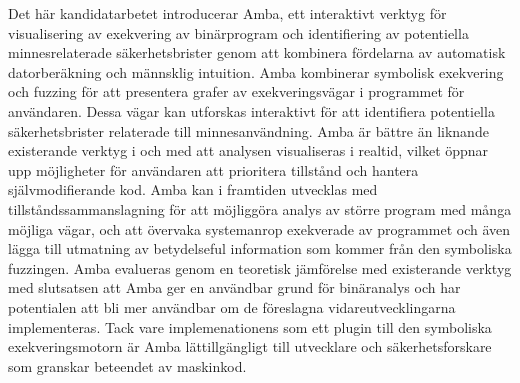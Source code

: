 Det här kandidatarbetet introducerar Amba, ett interaktivt verktyg för
visualisering av exekvering av binärprogram och identifiering av
potentiella minnesrelaterade säkerhetsbrister genom att kombinera
fördelarna av automatisk datorberäkning och männsklig intuition.  Amba
kombinerar symbolisk exekvering och fuzzing för att presentera grafer
av exekveringsvägar i programmet för användaren. Dessa vägar kan
utforskas interaktivt för att identifiera potentiella säkerhetsbrister
relaterade till minnesanvändning. Amba är bättre än liknande
existerande verktyg i och med att analysen visualiseras i realtid,
vilket öppnar upp möjligheter för användaren att prioritera tillstånd
och hantera självmodifierande kod. Amba kan i framtiden utvecklas med
tillståndssammanslagning för att möjliggöra analys av större program
med många möjliga vägar, och att övervaka systemanrop exekverade av
programmet och även lägga till utmatning av betydelseful information
som kommer från den symboliska fuzzingen. Amba evalueras genom en
teoretisk jämförelse med existerande verktyg med slutsatsen att Amba
ger en användbar grund för binäranalys och har potentialen att bli mer
användbar om de föreslagna vidareutvecklingarna implementeras.  Tack
vare implemenationens som ett plugin till den symboliska
exekveringsmotorn \stoe{} är Amba lättillgängligt till utvecklare och
säkerhetsforskare som granskar beteendet av maskinkod.
